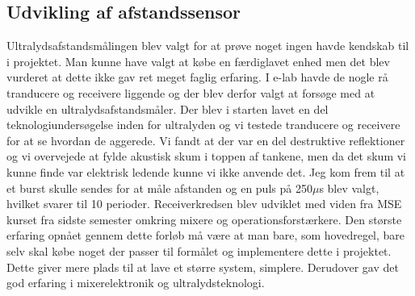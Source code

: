\subsection{Udvikling af afstandssensor}
Ultralydsafstandsmålingen blev valgt for at prøve noget ingen havde kendskab til i projektet. Man kunne have valgt at købe en færdiglavet enhed men det blev vurderet at dette ikke gav ret meget faglig erfaring. I e-lab havde de nogle rå tranducere og receivere liggende og der blev derfor valgt at forsøge med at udvikle en ultralydsafstandsmåler. Der blev i starten lavet en del teknologiundersøgelse inden for ultralyden og vi testede tranducere og receivere for at se hvordan de aggerede. Vi fandt at der var en del destruktive reflektioner og vi overvejede at fylde akustisk skum i toppen af tankene, men da det skum vi kunne finde var elektrisk ledende kunne vi ikke anvende det. Jeg kom frem til at et burst skulle sendes for at måle afstanden og en puls på 250$\mu$s blev valgt, hvilket svarer til 10 perioder. Receiverkredsen blev udviklet med viden fra MSE kurset fra sidste semester omkring mixere og operationsforstærkere. Den største erfaring opnået gennem dette forløb må være at man bare, som hovedregel, bare selv skal købe noget der passer til formålet og implementere dette i projektet. Dette giver mere plads til at lave et større system, simplere. Derudover gav det god erfaring i mixerelektronik og ultralydsteknologi.